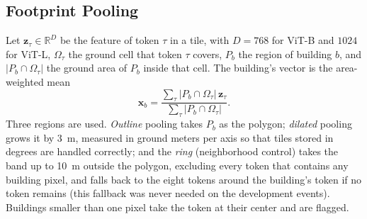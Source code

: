 \documentclass{ieeeaccess}
\begin{document}
\subsection{Footprint Pooling}
Let $\mathbf{z}_\tau\in\mathbb{R}^{D}$ be the feature of token $\tau$ in a tile, with $D=768$ for ViT-B and $1024$ for ViT-L, $\Omega_\tau$ the ground cell that token $\tau$ covers, $P_b$ the region of building $b$, and $|P_b\cap \Omega_\tau|$ the ground area of $P_b$ inside that cell. The building's vector is the area-weighted mean
\begin{equation}
\mathbf{x}_b=\frac{\sum_{\tau}|P_b\cap \Omega_\tau|\,\mathbf{z}_\tau}{\sum_{\tau}|P_b\cap \Omega_\tau|}.
\label{eq:pool}
\end{equation}
Three regions are used. \emph{Outline} pooling takes $P_b$ as the polygon; \emph{dilated} pooling grows it by 3~m, measured in ground meters per axis so that tiles stored in degrees are handled correctly; and the \emph{ring} (neighborhood control) takes the band up to 10~m outside the polygon, excluding every token that contains any building pixel, and falls back to the eight tokens around the building's token if no token remains (this fallback was never needed on the development events). Buildings smaller than one pixel take the token at their center and are flagged.
\end{document}
